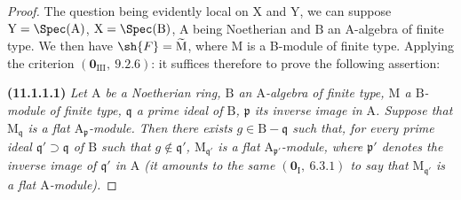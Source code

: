 \begin{proof}
The question being evidently local on $\mathrm{X}$ and $\mathrm{Y}$, we can suppose $\mathrm{Y}=\Spec(\mathrm{A})$, $\mathrm{X}=\Spec(\mathrm{B})$, $\mathrm{A}$ being Noetherian and $\mathrm{B}$ an A-algebra of finite type. We then have $\sh{F}=\widetilde{\mathrm{M}}$, where $\mathrm{M}$ is a B-module of finite type. Applying the criterion $(\mathbf{0}_{\mathrm{III}},~9.2.6)$: it suffices therefore to prove the following assertion:

\medskip
{}\label{IV.11.1.1.1}
\noindent\textbf{(11.1.1.1)}
\emph{Let $\mathrm{A}$ be a Noetherian ring, $\mathrm{B}$ an $\mathrm{A}$-algebra of finite type, $\mathrm{M}$ a $\mathrm{B}$-module of finite type, $\mathfrak{q}$ a prime ideal of $\mathrm{B}$, $\mathfrak{p}$ its inverse image in $\mathrm{A}$. Suppose that $\mathrm{M}_\mathfrak{q}$ is a flat $\mathrm{A}_\mathfrak{p}$-module. Then there exists $g\in\mathrm{B}-\mathfrak{q}$ such that, for every prime ideal $\mathfrak{q}'\supset\mathfrak{q}$ of $\mathrm{B}$ such that $g\notin\mathfrak{q}'$, $\mathrm{M}_{\mathfrak{q}'}$ is a flat $\mathrm{A}_{\mathfrak{p}'}$-module, where $\mathfrak{p}'$ denotes the inverse image of $\mathfrak{q}'$ in $\mathrm{A}$ (it amounts to the same $(\mathbf{0}_\mathrm{I},~6.3.1)$ to say that $\mathrm{M}_{\mathfrak{q}'}$ is a flat $\mathrm{A}$-module).}
\medskip


\end{proof}
